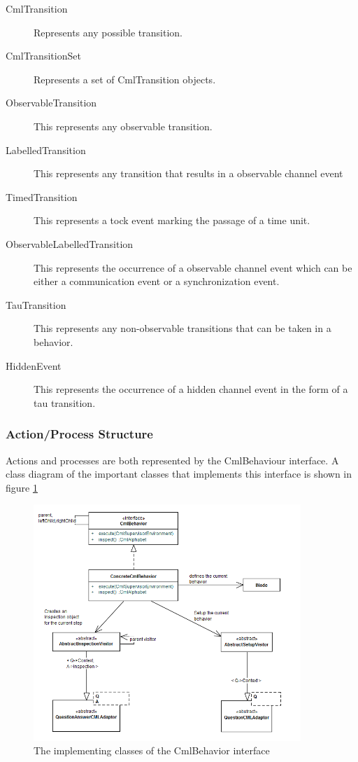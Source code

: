 \documentclass[a4paper, 10pt]{include/compassreport}   %
\begin{document}
\begin{description}
\item[CmlTransition] Represents any possible transition.
\item[CmlTransitionSet] Represents a set of CmlTransition objects.  
\item[ObservableTransition] This represents any observable transition.
\item[LabelledTransition] This represents any transition that results
  in a observable channel event
\item[TimedTransition] This represents a tock event marking the
  passage of a time unit.
\item[ObservableLabelledTransition] This represents the occurrence of
  a observable channel event which can be either a communication event
  or a synchronization event.
\item[TauTransition] This represents any non-observable transitions
  that can be taken in a behavior.
\item[HiddenEvent] This represents the occurrence of a hidden
  channel event in the form of a tau transition.
\end{description}

\subsubsection{Action/Process Structure}
\label{sec:action_process_structure}
Actions and processes are both represented by the CmlBehaviour
interface. A class diagram of the important classes that implements
this interface is shown in figure \ref{fig:cmlbehaviors}
\begin{figure}[ht!]
  \begin{center}
    \includegraphics[width=0.9\textwidth]{figures/CmlBehaviors}
    \caption{The implementing classes of the CmlBehavior interface}
    \label{fig:cmlbehaviors}
  \end{center}
\end{figure}
\end{document}
